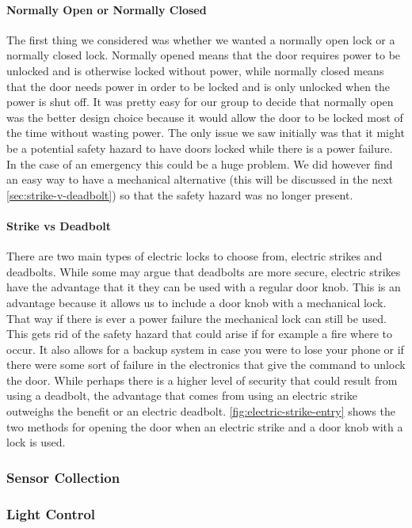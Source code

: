 \paragraph{Normally Open or Normally Closed}
The first thing we considered was whether we wanted a normally open lock or a
normally closed lock. Normally opened means that the door requires power to be
unlocked and is otherwise locked without power, while normally closed means
that the door needs power in order to be locked and is only unlocked when the
power is shut off. It was pretty easy for our group to decide that normally
open was the better design choice because it would allow the door to be locked
most of the time without wasting power. The only issue we saw initially was
that it might be a potential safety hazard to have doors locked while there is
a power failure. In the case of an emergency this could be a huge problem. We
did however find an easy way to have a mechanical alternative (this will be
discussed in the next \autoref{sec:strike-v-deadbolt}) so that the safety hazard was
no longer present.

\paragraph{Strike vs Deadbolt}
\label{sec:strike-v-deadbolt}
There are two main types of electric locks to choose from, electric strikes and
deadbolts. While some may argue that deadbolts are more secure, electric
strikes have the advantage that it they can be used with a regular door knob.
This is an advantage because it allows us to include a door knob with a
mechanical lock. That way if there is ever a power failure the mechanical lock
can still be used. This gets rid of the safety hazard that could arise if for
example a fire where to occur. It also allows for a backup system in case you
were to lose your phone or if there were some sort of failure in the
electronics that give the command to unlock the door. While perhaps there is a
higher level of security that could result from using a deadbolt, the advantage
that comes from using an electric strike outweighs the benefit or an electric
deadbolt. \autoref{fig:electric-strike-entry} shows the two methods for opening the door when
an electric strike and a door knob with a lock is used.


\subsubsection{Sensor Collection}

\subsubsection{Light Control}

